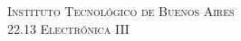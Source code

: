 %
%
%
% 
%
%

    
    
\newcommand{\HRule}{\rule{\linewidth}{0.5mm}} %
    
\center %
     
    
\textsc{\LARGE Instituto Tecnológico de Buenos Aires}\\[2cm] %
\textsc{\Large 22.13 Electrónica III}\\[1.5cm] %
    
    
